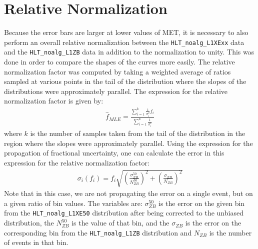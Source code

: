 \section{Relative Normalization}
Because the error bars are larger at lower values of MET, it is necessary to also perform an overall relative normalization between the \texttt{HLT\_noalg\_L1XExx} data and the \texttt{HLT\_noalg\_L1ZB} data in addition to the normalization to unity.
This was done in order to compare the shapes of the curves more easily.
The relative normalization factor was computed by taking a weighted average of ratios sampled at various points in the tail of the distribution where the slopes of the distributions were approximately parallel.
The expression for the relative normalization factor is given by:
\begin{align}
		\hat{f}_{MLE}=\frac{\sum_{i=1}^k \frac{1}{\sigma_i^2}f_i}{\sum_{i=1}^k \frac{1}{\sigma_i^2}}
\end{align}
where $k$ is the number of samples taken from the tail of the distribution in the region where the slopes were approximately parallel.
Using the expression for the propagation of fractional uncertainty, one can calculate the error in this expression for the relative normalization factor:
\begin{align}
		\sigma_i(f_i)=f_i\sqrt{\left( \frac{\sigma_{ZB}^{50}}{N_{ZB}^{50}} \right)^2+\left(\frac{\sigma_{ZB}}{N_{ZB}}\right)^2}
\end{align}
Note that in this case, we are not propagating the error on a single event, but on a given ratio of bin values. 
The variables are: $\sigma_{ZB}^{50}$ is the error on the given bin from the \texttt{HLT\_noalg\_L1XE50} distribution after being corrected to the unbiased distribution, the $N_{ZB}^{50}$ is the value of that bin, and the $\sigma_{ZB}$ is the error on the corresponding bin from the \texttt{HLT\_noalg\_L1ZB} distribution and $N_{ZB}$ is the number of events in that bin.
